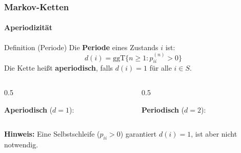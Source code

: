 \documentclass{beamer}
\begin{document}
\begin{frame}
    \frametitle{Markov-Ketten}
\framesubtitle{Aperiodizität}
    \begin{block}{Definition (Periode)}
Die \textbf{Periode} eines Zustands $i$ ist:
\[
d(i) = \mathrm{ggT}\{n \geq 1 : p_{ii}^{(n)} > 0\}
\]
Die Kette heißt \textbf{aperiodisch}, falls $d(i) = 1$ für alle $i \in S$.
\end{block}
\begin{columns}
\begin{column}{0.5\textwidth}
\begin{center}
\textbf{Aperiodisch} ($d=1$):\\[0.3cm]
\end{center}
\end{column}
\begin{column}{0.5\textwidth}
\begin{center}
\textbf{Periodisch} ($d=2$):\\[0.3cm]
\end{center}
\end{column}
\end{columns}
\vspace{0.3cm}
\textbf{Hinweis:} Eine Selbstschleife ($p_{ii} > 0$) garantiert $d(i)=1$, ist aber nicht notwendig.
 \end{frame}


\end{document}
